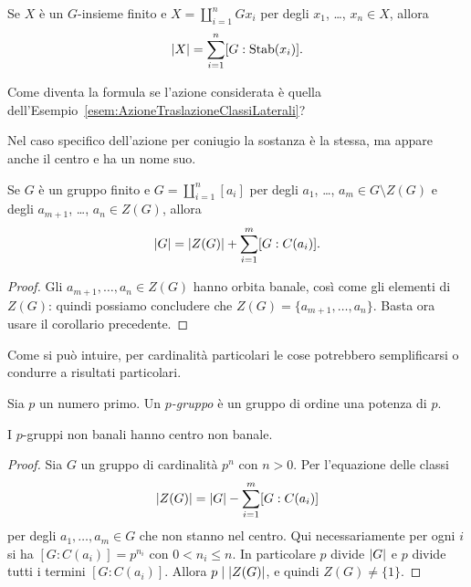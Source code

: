 \begin{teor}
Se $X$ è un $G$-insieme finito e $X = \coprod_{i=1}^n Gx_i$ per degli $x_1$, \dots{}, $x_n \in X$, allora
\[\left\lvert X\right\rvert=\sum_{i=1}^n[G:\operatorname{Stab}(x_i)] .\]
\end{teor}

\begin{eser}
Come diventa la formula se l'azione considerata è quella dell'Esempio~\ref{esem:AzioneTraslazioneClassiLaterali}?
\end{eser}

Nel caso specifico dell'azione per coniugio la sostanza è la stessa, ma appare anche il centro e ha un nome suo.

\begin{teor}\label{teor:FormulaClassi}
Se $G$ è un gruppo finito e $G = \coprod_{i=1}^n [a_i]$ per degli $a_1$, \dots{}, $a_m \in G \setminus Z(G)$ e degli $a_{m+1}$, \dots{}, $a_n \in Z(G)$, allora
\[\left\lvert G\right\rvert = \left\lvert Z(G)\right\rvert + \sum_{i=1}^m[G:C(a_i)] .\]
\end{teor}

\begin{proof}
Gli $a_{m+1}, \dots{}, a_n \in Z(G)$ hanno orbita banale, così come gli elementi di $Z(G)$: quindi possiamo concludere che $Z(G) = \{a_{m+1}, \dots{}, a_n\}$. Basta ora usare il corollario precedente.
\end{proof}




Come si può intuire, per cardinalità particolari le cose potrebbero semplificarsi o condurre a risultati particolari.

\begin{defi}
Sia $p$ un numero primo. Un {\em $p$-gruppo} è un gruppo di ordine una potenza di $p$.
\end{defi}

\begin{prop}
I $p$-gruppi non banali hanno centro non banale.
\end{prop}

\begin{proof}
Sia $G$ un gruppo di cardinalità $p^n$ con $n > 0$. Per l'equazione delle classi
\[\left\lvert Z(G)\right\rvert=\left\lvert G\right\rvert-\sum_{i=1}^m[G:C(a_i)]\]
per degli $a_1, \dots{}, a_m \in G$ che non stanno nel centro. Qui necessariamente per ogni $i$ si ha $[G: C(a_i)]=p^{n_i}$ con $0 < n_i \le n$. In particolare $p$ divide $\left\lvert G\right\rvert$ e $p$ divide tutti i termini $[G:C(a_i)]$. Allora $p\mid\left\lvert Z(G)\right\rvert$, e quindi $Z(G) \ne \{1\}$.
\end{proof}

